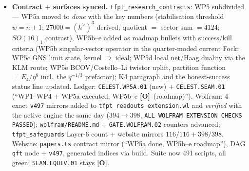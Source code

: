 \documentclass[11pt]{article}
\providecommand{\mO}{\textbf{[O]}}\providecommand{\mX}{\textbf{[X]}}
\begin{document}
\begin{itemize}[leftmargin=1.5em]
$5304\neq14^3$ (the $h^{\vee\,3}$ identity is not generic), quotient $2076=\Theta_{D_8}/\eta^8$ at
$q^2$ (the recipe validated on a second algebra), block weights $(0,\tfrac12,1,1)$ break one-block
fusion (vs $E_8$'s integer $(0,1,1,1)$); only $P=4=|\mu_4|$ periodisation reproduces the 248 layer;
swapped glue breaks the zero-mode anchor ($64\neq60$). \emph{Honest} \mO: the limit does \emph{not}
generate the truncation --- the singular vector as an \emph{operator} in the limit net (WP5b), the GNS
limit state (WP5c) and local normality/Haag duality (WP5d) stay open; the celestial route now has the
same two-step shape as MMST (limit $+$ maximal ideal), with the ideal quantitatively fixed;
\texttt{SEAM.EQUIV.01} untouched.
\item \textbf{Contract $+$ surfaces synced.} \texttt{tfpt\_research\_contracts}: WP5 subdivided ---
WP5a moved to \emph{done} with the key numbers (stabilisation threshold $w=n{+}1$; $27000=(h^\vee)^3$
derived; quotient $=$ sector sum $=4124$; $SO(16)_1$ contrast), WP5b--e added as roadmap bullets with
success/kill criteria (WP5b singular-vector operator in the quarter-moded current Fock; WP5c GNS limit
state, kernel $\supseteq$ ideal; WP5d local net/Haag duality via the KLM route; WP5e BCOV/Costello--Li
twistor uplift, partition function $=E_4/\eta^8$ incl.\ the $q^{-1/3}$ prefactor); K4 paragraph and the
honest-success status line updated. Ledger: \texttt{CELEST.WP5A.01} (new) $+$ \texttt{CELEST.SEAM.01}
(``WP1--WP4 $+$ WP5a executed; WP5b--e \mO\ (roadmap)''). Wolfram: 4 exact \texttt{v497} mirrors added
to \texttt{tfpt\_readouts\_extension.wl} and \emph{verified} with the active engine the same day
($394\to398$, \texttt{ALL WOLFRAM EXTENSION CHECKS PASSED}); \texttt{wolfram/README.md} $+$
\texttt{GATE.WOLFRAM.02} counters advanced; \texttt{tfpt\_safeguards} Layer-6 count $+$ website mirrors
$116/116+398/398$. Website: \texttt{papers.ts} contract mirror (``WP5a done, WP5b--e roadmap''), DAG
\texttt{qft} node $+$ \texttt{v497}, generated indices via build. Suite now 491 scripts, all green;
\texttt{SEAM.EQUIV.01} stays \mO.
\end{itemize}
\end{document}
